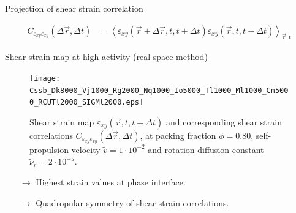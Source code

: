 \documentclass{beamer}
\begin{document}
\begin{frame}{Projection of shear strain correlation}


\begin{align*}
C_{\varepsilon_{xy}\varepsilon_{xy}}(\Delta \vec{r}, \Delta t) &= \left<\varepsilon_{xy}(\vec{r}+\Delta\vec{r}, t, t + \Delta t)\varepsilon_{xy}(\vec{r}, t, t + \Delta t)\right>_{\vec{r}, t}
\end{align*}


\end{frame}

\begin{frame}{Shear strain map at high activity (real space method)}

\vspace{-0.2cm}
\begin{figure}[h!]
  \centering
  \texttt{[image: Cssb\_Dk8000\_Vj1000\_Rg2000\_Nq1000\_Io5000\_Tl1000\_Ml1000\_Cn5000\_RCUTl2000\_SIGMl2000.eps]}
  \vspace{-0.6cm}
  \caption{Shear strain map $\varepsilon_{xy}(\vec{r}, t, t + \Delta t)$ and corresponding shear strain correlations $C_{\varepsilon_{xy}\varepsilon_{xy}}(\Delta\vec{r}, \Delta t)$, at packing fraction $\phi=0.80$, self-propulsion velocity $\tilde{v}=1\cdot10^{-2}$ and rotation diffusion constant $\tilde{\nu}_r=2\cdot10^{-5}$.}
\end{figure}

\vspace{-0.5cm}
\begin{itemize}
  \item[$\rightarrow$] Highest strain values at phase interface.
  \item[$\rightarrow$] Quadropular symmetry of shear strain correlations.
\end{itemize}

\end{frame}
\end{document}
